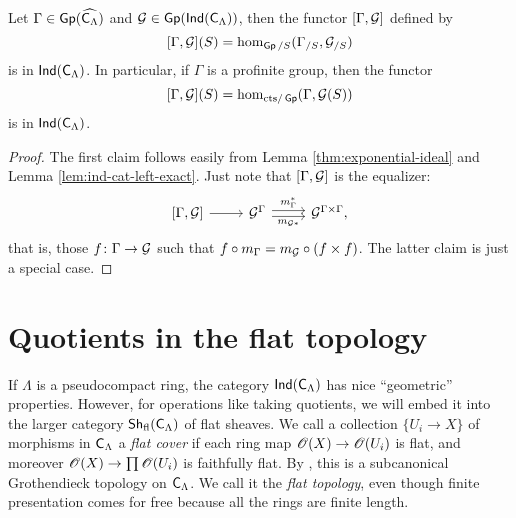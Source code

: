 \begin{corollary}\label{thm:framed-deformation}
Let $\Gamma\in \operatorname{\mathsf{Gp}}(\widehat{\mathsf{C}_\Lambda})$ and 
$\mathcal{G}\in \operatorname{\mathsf{Gp}}(\operatorname{\mathsf{Ind}}(\mathsf{C}_\Lambda))$, then the functor 
$[\Gamma,\mathcal{G}]$ defined by 
\[
	[\Gamma,\mathcal{G}](S) = \hom_{\operatorname{\mathsf{Gp}}/S}(\Gamma_{/S},\mathcal{G}_{/S}) 
\]
is in $\operatorname{\mathsf{Ind}}(\mathsf{C}_\Lambda)$. In particular, if $\Gamma$ is a 
profinite group, then the functor 
\[
	[\Gamma,\mathcal{G}](S) = \hom_{\mathrm{cts}/\operatorname{\mathsf{Gp}}}(\Gamma,\mathcal{G}(S))
\]
is in $\operatorname{\mathsf{Ind}}(\mathsf{C}_\Lambda)$. 
\end{corollary}
\begin{proof}
The first claim follows easily from Lemma \ref{thm:exponential-ideal} and 
Lemma \ref{lem:ind-cat-left-exact}. Just note that $[\Gamma,\mathcal{G}]$ is the 
equalizer:
\[
\begin{tikzcd}
	{[\Gamma,\cG]} \ar[r]
		& \cG^\Gamma \ar[r, "m_\Gamma^\ast", shift left=.5ex] \ar[r, "m_{\cG\ast}"', shift right=.5ex]
		& \cG^{\Gamma\times \Gamma} ,
\end{tikzcd}
\]
that is, those $f\colon \Gamma\to \mathcal{G}$ such that 
$f\circ m_\Gamma = m_{\mathcal{G}}\circ(f\times f)$. The latter claim is just 
a special case. 
\end{proof}





\section{Quotients in the flat topology}

If $\Lambda$ is a pseudocompact ring, the category 
$\operatorname{\mathsf{Ind}}(\mathsf{C}_\Lambda)$ has nice ``geometric'' properties. However, 
for operations like taking quotients, we will embed it into the larger category 
$\operatorname{\mathsf{Sh}}_{\mathrm{fl}}(\mathsf{C}_\Lambda)$ of flat sheaves. We call a collection 
$\{U_i\to X\}$ of morphisms in $\mathsf{C}_\Lambda$ a \emph{flat cover} if each 
ring map $\mathscr{O}(X)\to \mathscr{O}(U_i)$ is flat, and moreover 
$\mathscr{O}(X)\to \prod \mathscr{O}(U_i)$ is faithfully flat. By \cite[IV 6.3.1]{sga3-1}, this 
is a subcanonical Grothendieck topology on $\mathsf{C}_\Lambda$. We call it the 
\emph{flat topology}, even though finite presentation comes for free because 
all the rings are finite length. 

